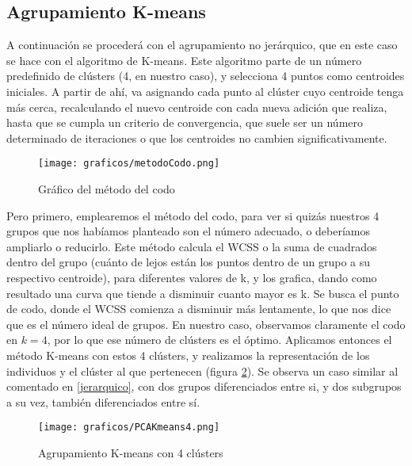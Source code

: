 \documentclass[a4paper,onecolumn]{extarticle}
\begin{document}
\begin{sloppypar}
\subsection{Agrupamiento K-means} \label{kmeans}
A continuación se procederá con el agrupamiento no jerárquico, que en este caso se hace con el algoritmo de K-means. Este algoritmo parte de un número 
predefinido de clústers (4, en nuestro caso), y selecciona 4 puntos como centroides iniciales. A partir de ahí, va asignando cada punto al clúster cuyo centroide 
tenga más cerca, recalculando el nuevo centroide con cada nueva adición que realiza, hasta que se cumpla un criterio de convergencia, que suele ser un 
número determinado de iteraciones o que los centroides no cambien significativamente.
\begin{center}
    \begin{figure}[h!]
        \centering
        \texttt{[image: graficos/metodoCodo.png]}
        \caption{Gráfico del método del codo}
        \label{fig:metodoCodo}
    \end{figure}
\end{center}
Pero primero, emplearemos el método del codo, para ver si quizás nuestros 4 grupos que nos habíamos planteado son el número adecuado, o deberíamos ampliarlo 
o reducirlo. Este método calcula el WCSS o la suma de cuadrados dentro del grupo (cuánto de lejos están los puntos dentro de un grupo a su respectivo centroide), 
para diferentes valores de k, y los grafica, dando como resultado una curva que tiende a disminuir cuanto mayor es k. Se busca el punto de codo, donde el WCSS 
comienza a disminuir más lentamente, lo que nos dice que es el número ideal de grupos. En nuestro caso, observamos claramente el codo en $k=4$, por lo que 
ese número de clústers es el óptimo. Aplicamos entonces el método K-means con estos 4 clústers, y realizamos la representación de los individuos y el clúster 
al que pertenecen (figura \ref{fig:KMEANS4}). Se observa un caso similar al comentado en \ref{jerarquico}, con dos grupos diferenciados entre si, y dos subgrupos 
a su vez, también diferenciados entre sí.
\begin{center}
    \begin{figure}[h!]
        \centering
        \texttt{[image: graficos/PCAKmeans4.png]}
        \caption{Agrupamiento K-means con 4 clústers}
        \label{fig:KMEANS4}
    \end{figure}
\end{center}


\end{sloppypar}
\end{document}
